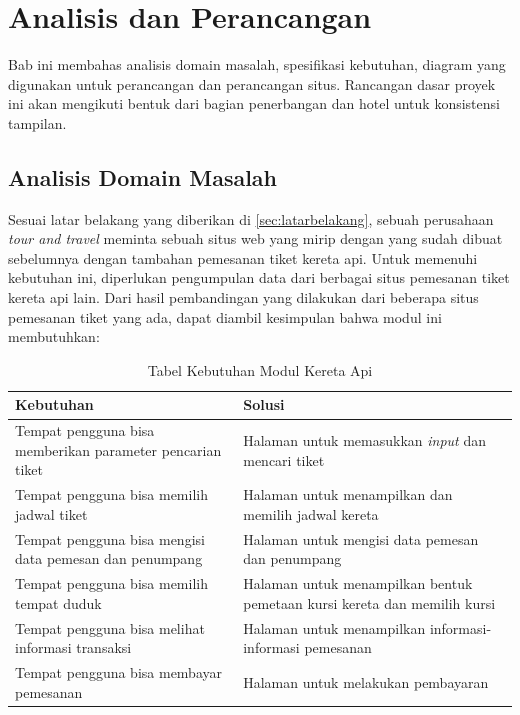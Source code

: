 \chapter{Analisis dan Perancangan}
\label{chap:analisisdanperancangan}
Bab ini membahas analisis domain masalah, spesifikasi kebutuhan, diagram yang digunakan untuk perancangan dan perancangan situs. Rancangan dasar proyek ini akan mengikuti bentuk dari bagian penerbangan dan hotel untuk konsistensi tampilan.

\section{Analisis Domain Masalah}
\label{sec:analisisdomainmasalah} 

Sesuai latar belakang yang diberikan di \ref{sec:latarbelakang}, sebuah perusahaan \textit{tour and travel} meminta sebuah situs web yang mirip dengan yang sudah dibuat sebelumnya dengan tambahan pemesanan tiket kereta api. Untuk memenuhi kebutuhan ini, diperlukan pengumpulan data dari berbagai situs pemesanan tiket kereta api lain. Dari hasil pembandingan yang dilakukan dari beberapa situs pemesanan tiket yang ada, dapat diambil kesimpulan bahwa modul ini membutuhkan:

\begin{table}[H]
	\centering 
	\caption{Tabel Kebutuhan Modul Kereta Api}
	\label{tab:kebutuhankeretaapi}
	\begin{tabular}{|p{5cm}|p{5cm}|}
		\hline
		Kebutuhan & Solusi\\
		\hline
		
		\hline
		Tempat pengguna bisa memberikan parameter pencarian tiket & Halaman untuk memasukkan \textit{input} dan mencari tiket\\
		\hline
		Tempat pengguna bisa memilih jadwal tiket & Halaman untuk menampilkan dan memilih jadwal kereta\\
		\hline
		Tempat pengguna bisa mengisi data pemesan dan penumpang & Halaman untuk mengisi data pemesan dan penumpang\\
		\hline
		Tempat pengguna bisa memilih tempat duduk & Halaman untuk menampilkan bentuk pemetaan kursi kereta dan memilih kursi\\
		\hline
		Tempat pengguna bisa melihat informasi transaksi & Halaman untuk menampilkan informasi-informasi pemesanan\\
		\hline
		Tempat pengguna bisa membayar pemesanan & Halaman untuk melakukan pembayaran\\
		\hline
		
	\end{tabular} 
\end{table}

